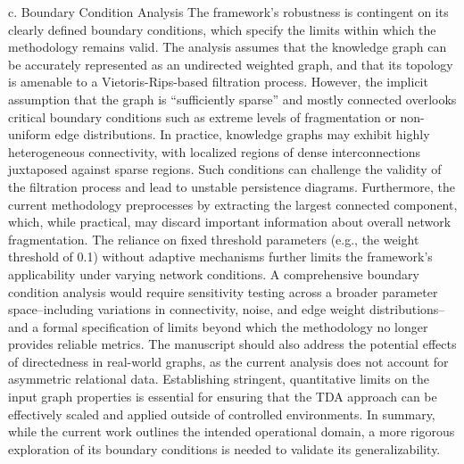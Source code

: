 \documentclass{article}
\begin{document}
c. Boundary Condition Analysis  
The framework’s robustness is contingent on its clearly defined boundary conditions, which specify the limits within which the methodology remains valid. The analysis assumes that the knowledge graph can be accurately represented as an undirected weighted graph, and that its topology is amenable to a Vietoris-Rips-based filtration process. However, the implicit assumption that the graph is “sufficiently sparse” and mostly connected overlooks critical boundary conditions such as extreme levels of fragmentation or non-uniform edge distributions. In practice, knowledge graphs may exhibit highly heterogeneous connectivity, with localized regions of dense interconnections juxtaposed against sparse regions. Such conditions can challenge the validity of the filtration process and lead to unstable persistence diagrams. Furthermore, the current methodology preprocesses by extracting the largest connected component, which, while practical, may discard important information about overall network fragmentation. The reliance on fixed threshold parameters (e.g., the weight threshold of 0.1) without adaptive mechanisms further limits the framework’s applicability under varying network conditions. A comprehensive boundary condition analysis would require sensitivity testing across a broader parameter space--including variations in connectivity, noise, and edge weight distributions--and a formal specification of limits beyond which the methodology no longer provides reliable metrics. The manuscript should also address the potential effects of directedness in real-world graphs, as the current analysis does not account for asymmetric relational data. Establishing stringent, quantitative limits on the input graph properties is essential for ensuring that the TDA approach can be effectively scaled and applied outside of controlled environments. In summary, while the current work outlines the intended operational domain, a more rigorous exploration of its boundary conditions is needed to validate its generalizability.
\end{document}
